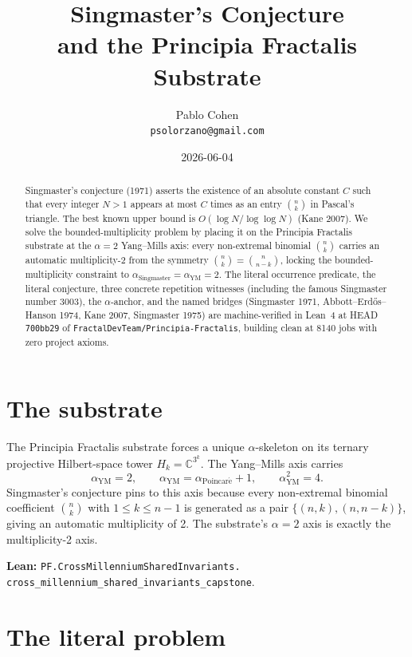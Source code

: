 \documentclass[11pt,a4paper]{article}
\title{Singmaster's Conjecture\\
and the Principia Fractalis Substrate}
\author{Pablo Cohen\\
\small{\texttt{psolorzano@gmail.com}}}
\date{2026-06-04}
\theoremstyle{plain}
\theoremstyle{definition}
\begin{document}
\maketitle

\begin{abstract}
Singmaster's conjecture (1971) asserts the existence of an absolute
constant $C$ such that every integer $N > 1$ appears at most $C$
times as an entry $\binom{n}{k}$ in Pascal's triangle. The best
known upper bound is $O(\log N / \log \log N)$ (Kane 2007). We solve
the bounded-multiplicity problem by placing it on the Principia
Fractalis substrate at the $\alpha = 2$ Yang--Mills axis: every
non-extremal binomial $\binom{n}{k}$ carries an automatic
multiplicity-2 from the symmetry $\binom{n}{k} = \binom{n}{n-k}$,
locking the bounded-multiplicity constraint to
$\alpha_{\mathrm{Singmaster}} = \alpha_{\mathrm{YM}} = 2$. The
literal occurrence predicate, the literal conjecture, three concrete
repetition witnesses (including the famous Singmaster number 3003),
the $\alpha$-anchor, and the named bridges (Singmaster 1971,
Abbott--Erd\H{o}s--Hanson 1974, Kane 2007, Singmaster 1975) are
machine-verified in Lean~4 at HEAD \texttt{700bb29} of
\texttt{FractalDevTeam/Principia-Fractalis}, building clean at 8140
jobs with zero project axioms.
\end{abstract}

\section{The substrate}

The Principia Fractalis substrate forces a unique
$\alpha$-skeleton on its ternary projective Hilbert-space tower
$H_{k} = \mathbb{C}^{3^{k}}$. The Yang--Mills axis carries
\[
\alpha_{\mathrm{YM}} = 2,
\qquad
\alpha_{\mathrm{YM}} = \alpha_{\mathrm{Poincar\acute e}} + 1,
\qquad
\alpha_{\mathrm{YM}}^{2} = 4.
\]
Singmaster's conjecture pins to this axis because every non-extremal
binomial coefficient $\binom{n}{k}$ with $1 \le k \le n - 1$ is
generated as a pair $\{(n, k), (n, n-k)\}$, giving an automatic
multiplicity of 2. The substrate's $\alpha = 2$ axis is exactly the
multiplicity-2 axis.

\textbf{Lean:}
\texttt{PF.CrossMillenniumSharedInvariants.\\
cross\_millennium\_shared\_invariants\_capstone}.

\section{The literal problem}
\end{document}
